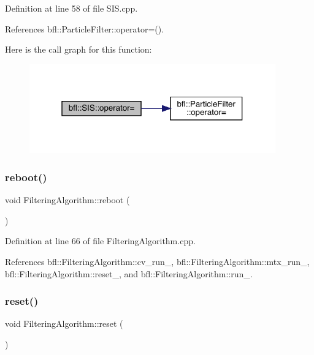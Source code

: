 Definition at line 58 of file S\+I\+S.\+cpp.



References bfl\+::\+Particle\+Filter\+::operator=().

Here is the call graph for this function\+:
\nopagebreak
\begin{figure}[H]
\begin{center}
\leavevmode
\includegraphics[width=301pt]{classbfl_1_1SIS_a32458a24446df8126ace63f21de2bf02_cgraph}
\end{center}
\end{figure}
\mbox{\label{classbfl_1_1FilteringAlgorithm_a6022859aa985474fb997343cc935b11e}} 
\subsubsection{\texorpdfstring{reboot()}{reboot()}}
{\footnotesize\ttfamily void Filtering\+Algorithm\+::reboot (\begin{DoxyParamCaption}{ }\end{DoxyParamCaption})\hspace{0.3cm}{\ttfamily [inherited]}}



Definition at line 66 of file Filtering\+Algorithm.\+cpp.



References bfl\+::\+Filtering\+Algorithm\+::cv\+\_\+run\+\_\+, bfl\+::\+Filtering\+Algorithm\+::mtx\+\_\+run\+\_\+, bfl\+::\+Filtering\+Algorithm\+::reset\+\_\+, and bfl\+::\+Filtering\+Algorithm\+::run\+\_\+.

\mbox{\label{classbfl_1_1FilteringAlgorithm_a2403c62fbd7bd7f5cda56a84f5f30331}} 
\subsubsection{\texorpdfstring{reset()}{reset()}}
{\footnotesize\ttfamily void Filtering\+Algorithm\+::reset (\begin{DoxyParamCaption}{ }\end{DoxyParamCaption})\hspace{0.3cm}{\ttfamily [inherited]}}



